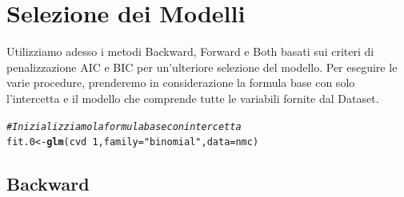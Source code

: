 \documentclass{article}\usepackage[]{graphicx}\usepackage[]{xcolor}
\makeatletter
\newcommand{\hlnum}[1]{\textcolor[rgb]{0.686,0.059,0.569}{#1}}%
\newcommand{\hlstr}[1]{\textcolor[rgb]{0.192,0.494,0.8}{#1}}%
\newcommand{\hlcom}[1]{\textcolor[rgb]{0.678,0.584,0.686}{\textit{#1}}}%
\newcommand{\hlopt}[1]{\textcolor[rgb]{0,0,0}{#1}}%
\newcommand{\hlstd}[1]{\textcolor[rgb]{0.345,0.345,0.345}{#1}}%
\newcommand{\hlkwb}[1]{\textcolor[rgb]{0.69,0.353,0.396}{#1}}%
\newcommand{\hlkwc}[1]{\textcolor[rgb]{0.333,0.667,0.333}{#1}}%
\newcommand{\hlkwd}[1]{\textcolor[rgb]{0.737,0.353,0.396}{\textbf{#1}}}%
\newenvironment{kframe}{%
 \def\at@end@of@kframe{}%
 \ifinner\ifhmode%
  \def\at@end@of@kframe{\end{minipage}}%
  \begin{minipage}{\columnwidth}%
 \fi\fi%
 \def\FrameCommand##1{\hskip\@totalleftmargin \hskip-\fboxsep
 \colorbox{shadecolor}{##1}\hskip-\fboxsep
     \hskip-\linewidth \hskip-\@totalleftmargin \hskip\columnwidth}%
 \MakeFramed {\advance\hsize-\width
   \@totalleftmargin\z@ \linewidth\hsize
   \@setminipage}}%
 {\par\unskip\endMakeFramed%
 \at@end@of@kframe}
\newenvironment{knitrout}{}{} %
\makeatother
\begin{document}
\clearpage


\section{Selezione dei Modelli}
  Utilizziamo adesso i metodi Backward, Forward e Both basati sui criteri di 
  penalizzazione AIC e BIC per un'ulteriore selezione del modello.
  Per eseguire le varie procedure, prenderemo in considerazione la formula base 
  con solo l'intercetta e il modello che comprende tutte le variabili fornite 
  dal Dataset.
  
\begin{knitrout}
\color{fgcolor}\begin{kframe}
\begin{alltt}
\hlcom{#Inizializziamo la formula base con intercetta}
\hlstd{fit.0} \hlkwb{<-} \hlkwd{glm}\hlstd{(cvd}\hlopt{~}\hlnum{1}\hlstd{,} \hlkwc{family}\hlstd{=}\hlstr{"binomial"}\hlstd{,} \hlkwc{data}\hlstd{=nmc)}
\end{alltt}
\end{kframe}
\end{knitrout}

   \subsection{Backward}
\end{document}
